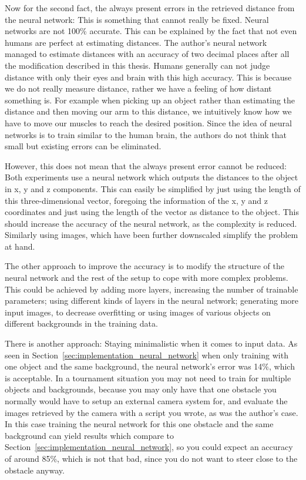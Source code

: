 Now for the second fact, the always present errors in the retrieved distance from the neural network: This is something that cannot really be fixed. Neural networks are not 100\% accurate. This can be explained by the fact that not even humans are perfect at estimating distances. The author's neural network managed to estimate distances with an accuracy of two decimal places after all the modification described in this thesis. Humans generally can not judge distance with only their eyes and brain with this high accuracy. This is because we do not really measure distance, rather we have a feeling of how distant something is. For example when picking up an object rather than estimating the distance and then moving our arm to this distance, we intuitively know how we have to move our muscles to reach the desired position. Since the idea of neural networks is to train similar to the human brain, the authors do not think that small but existing errors can be eliminated. 

However, this does not mean that the always present error cannot be reduced: Both experiments use a neural network which outputs the distances to the object in x, y and z components. This can easily be simplified by just using the length of this three-dimensional vector, foregoing the information of the x, y and z coordinates and just using the length of the vector as distance to the object. This should increase the accuracy of the neural network, as the complexity is reduced. Similarly using images, which have been further downscaled simplify the problem at hand.

The other approach to improve the accuracy is to modify the structure of the neural network and the rest of the setup to cope with more complex problems. This could be achieved by adding more layers, increasing the number of trainable parameters; using different kinds of layers in the neural network; generating more input images, to decrease overfitting or using images of various objects on different backgrounds in the training data.

There is another approach: Staying minimalistic when it comes to input data. As seen in Section~\ref{sec:implementation_neural_network} when only training with one object and the same background, the neural network's error was 14\%, which is acceptable. In a tournament situation you may not need to train for multiple objects and backgrounds, because you may only have that one obstacle you normally would have to setup an external camera system for, and evaluate the images retrieved by the camera with a script you wrote, as was the author's case. In this case training the neural network for this one obstacle and the same background can yield results which compare to Section~\ref{sec:implementation_neural_network}, so you could expect an accuracy of around 85\%, which is not that bad, since you do not want to steer close to the obstacle anyway.

